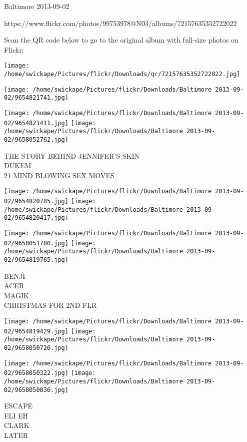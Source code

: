 \documentclass[10pt,letterpaper]{article}
\begin{document}
Baltimore 2013-09-02

https://www.flickr.com/photos/99753978@N03/albums/72157635352722022

Scan the QR code below to go to the original album with full-size photos on Flickr:

\texttt{[image: /home/swickape/Pictures/flickr/Downloads/qr/72157635352722022.jpg]}
\pagebreak

\texttt{[image: /home/swickape/Pictures/flickr/Downloads/Baltimore 2013-09-02/9654821741.jpg]}

\vspace{0.25in}
\texttt{[image: /home/swickape/Pictures/flickr/Downloads/Baltimore 2013-09-02/9654821411.jpg]}
\texttt{[image: /home/swickape/Pictures/flickr/Downloads/Baltimore 2013-09-02/9658052762.jpg]}

THE STORY BEHIND JENNIFER'S SKIN\\
DUKEM\\
21 MIND BLOWING SEX MOVES\\
\pagebreak

\texttt{[image: /home/swickape/Pictures/flickr/Downloads/Baltimore 2013-09-02/9654820785.jpg]}
\texttt{[image: /home/swickape/Pictures/flickr/Downloads/Baltimore 2013-09-02/9654820417.jpg]}

\texttt{[image: /home/swickape/Pictures/flickr/Downloads/Baltimore 2013-09-02/9658051780.jpg]}
\texttt{[image: /home/swickape/Pictures/flickr/Downloads/Baltimore 2013-09-02/9654819765.jpg]}

BENJI\\
ACER\\
MAGIK\\
CHRISTMAS FOR 2ND FLR\\
\pagebreak

\texttt{[image: /home/swickape/Pictures/flickr/Downloads/Baltimore 2013-09-02/9654819429.jpg]}
\texttt{[image: /home/swickape/Pictures/flickr/Downloads/Baltimore 2013-09-02/9658050726.jpg]}

\texttt{[image: /home/swickape/Pictures/flickr/Downloads/Baltimore 2013-09-02/9658050322.jpg]}
\texttt{[image: /home/swickape/Pictures/flickr/Downloads/Baltimore 2013-09-02/9658050036.jpg]}

ESCAPE\\
ELI EH\\
CLARK\\
LATER\\
\pagebreak
\end{document}
